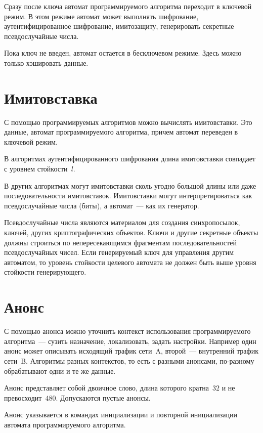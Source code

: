 Сразу после  ключа автомат программируемого алгоритма 
переходит в ключевой режим. В этом режиме автомат может выполнять шифрование, 
аутентифицированное шифрование, имитозащиту, генерировать секретные 
псевдослучайные числа.

Пока ключ не введен, автомат остается в бесключевом режиме. Здесь можно только 
хэшировать данные. 

\section{Имитовставка}\label{COMMON.MAC}

С помощью программируемых алгоритмов можно вычислять имитовставки.
Это данные,  автомат программируемого 
алгоритма, причем автомат переведен в ключевой режим.

В алгоритмах аутентифицированного шифрования длина имитовставки 
совпадает с уровнем стойкости~$l$. 

В других алгоритмах могут  имитовставки сколь угодно 
большой длины или даже последовательности имитовставок. Имитовставки могут 
интерпретироваться как псевдослучайные числа (биты), а автомат~--- как их 
генератор. 

Псевдослучайные числа являются материалом для создания синхропосылок,
ключей, других криптографических объектов. 
%
Ключи и другие секретные объекты должны строиться по непересекающимся 
фрагментам последовательностей псевдослучайных чисел.
%
Если генерируемый ключ  для управления другим автоматом, 
то уровень стойкости целевого автомата не должен быть выше уровня стойкости
генерирующего.

\section{Анонс}\label{COMMON.Anounce}

С помощью анонса можно уточнить контекст использования программируемого 
алгоритма~--- сузить назначение, локализовать, задать настройки.
%
Например один анонс может описывать исходящий трафик сети~A, 
второй~--- внутренний трафик сети~B.
%
Алгоритмы разных контекстов, то есть с разными анонсами, 
по-разному обрабатывают одни и те же данные. 

Анонс представляет собой двоичное слово, длина которого кратна~$32$ и не 
превосходит~$480$. Допускаются пустые анонсы.

Анонс указывается в командах инициализации и повторной инициализации
автомата программируемого алгоритма. 

